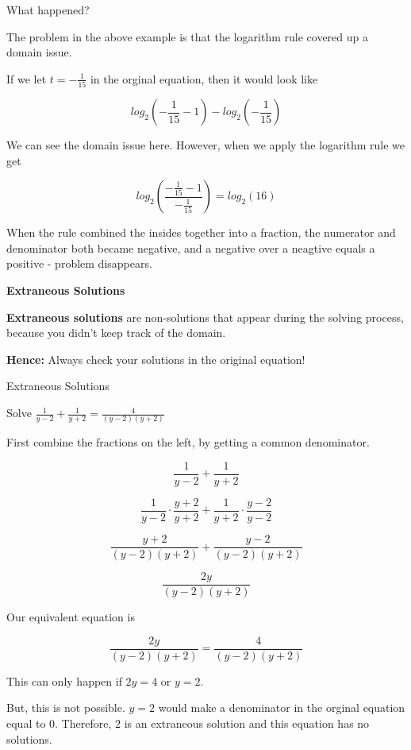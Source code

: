 \documentclass{ximera}
\begin{document}
What happened?


The problem in the above example is that the logarithm rule covered up a domain issue.

If we let $t = -\frac{1}{15}$ in the orginal equation, then it would look like 


\[    log_2\left(-\frac{1}{15}-1\right) - log_2\left(-\frac{1}{15}\right)   \]

We can see the domain issue here.  However, when we apply the logarithm rule we get



\[   log_2\left(\frac{-\frac{1}{15}-1}{-\frac{1}{15}}\right)    = log_2(16)  \]


When the rule combined the insides together into a fraction, the numerator and denominator both became negative, and a negative over a neagtive equals a positive - problem disappears.





\begin{definition}  \textbf{\textcolor{green!50!black}{Extraneous Solutions}}

\textbf{Extraneous solutions} are non-solutions that appear during the solving process, because you didn't keep track of the domain.

\end{definition}

\textbf{Hence:} Always check your solutions in the original equation!







\begin{example} Extraneous Solutions


Solve $\frac{1}{y-2} + \frac{1}{y+2} = \frac{4}{(y-2)(y+2)}$


\begin{explanation}



First combine the fractions on the left, by getting a common denominator.



\[    \frac{1}{y-2} + \frac{1}{y+2}        \]

\[    \frac{1}{y-2} \cdot \frac{y+2}{y+2} + \frac{1}{y+2}  \cdot \frac{y-2}{y-2}       \]

\[    \frac{y+2}{(y-2)(y+2)} + \frac{y-2}{(y-2)(y+2)}      \]

\[    \frac{2y}{(y-2)(y+2)}     \]

Our equivalent equation is


\[    \frac{2y}{(y-2)(y+2)}   = \frac{4}{(y-2)(y+2)}   \]


This can only happen if $2y = 4$ or $y = 2$.

But, this is not possible.  $y=2$ would make a denominator in the orginal equation equal to $0$.  Therefore, $2$ is an extraneous solution and this equation has no solutions.


\end{explanation}
\end{example}
\end{document}
